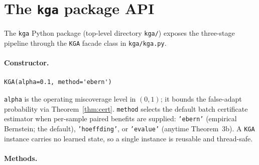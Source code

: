 \section{The \texttt{kga} package API}
\label{sec:kga-api}

The \texttt{kga} Python package (top-level directory \texttt{kga/}) exposes the
three-stage pipeline through the \texttt{KGA} facade class in \texttt{kga/kga.py}.

\paragraph{Constructor.}

\begin{verbatim}
KGA(alpha=0.1, method='ebern')
\end{verbatim}

\texttt{alpha} is the operating miscoverage level in $(0, 1)$; it bounds the
false-adapt probability via Theorem~\ref{thm:cert}.  \texttt{method} selects the
default batch certificate estimator when per-sample paired benefits are supplied:
\texttt{'ebern'} (empirical Bernstein; the default), \texttt{'hoeffding'}, or
\texttt{'evalue'} (anytime Theorem~3b).  A \texttt{KGA} instance carries no
learned state, so a single instance is reusable and thread-safe.

\paragraph{Methods.}

